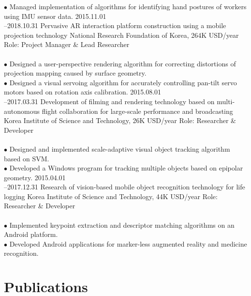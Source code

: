 \documentclass[]{friggeri-cv}
\begin{document}
\begin{entrylist}
{    $\bullet$ Managed implementation of algorithms for identifying hand postures of workers using IMU sensor data.
    }
  \entry
    {2015.11.01\\--2018.10.31} 
    {Pervasive AR interaction platform construction using a mobile projection technology}
    {National Research Foundation of Korea, 264K USD/year}
    {Role: Project Manager \& Lead Researcher\\
    \\
    $\bullet$ Designed a user-perspective rendering algorithm for correcting distortions of projection mapping caused by surface geometry.\\
    $\bullet$ Designed  a visual servoing algorithm for accurately controlling pan-tilt servo motors based on rotation axis calibration.
    }
  \entry
    {2015.08.01\\--2017.03.31}
    {Development of filming and rendering technology based on multi-autonomous flight collaboration for large-scale performance and broadcasting}
    {Korea Institute of Science and Technology, 26K USD/year}
    {Role: Researcher \& Developer\\
    \\
    $\bullet$ Designed and implemented scale-adaptive visual object tracking algorithm based on SVM.\\
    $\bullet$ Developed a Windows program for tracking multiple objects based on epipolar geometry.
    }
  \entry
    {2015.04.01\\--2017.12.31}
    {Research of vision-based mobile object recognition technology for life logging}
    {Korea Institute of Science and Technology, 44K USD/year}
    {Role: Researcher \& Developer\\
    \\
    $\bullet$ Implemented keypoint extraction and descriptor matching algorithms on an Android platform.\\
    $\bullet$ Developed Android applications for marker-less augmented reality and medicine recognition.
    }
\end{entrylist}

\section{Publications}

\begin{refsection}
  \nocite{*}
  \printbibliography[
    type=article, 
    title=\textbf{Articles in peer-reviewed journals}, 
    heading=subbibliography
  ]
\end{refsection}

\begin{refsection}
  \nocite{*}
  \printbibliography[
    type=inproceedings, 
    title=\textbf{Proceedings at peer-reviewed conferences}, 
    heading=subbibliography
  ]
\end{refsection}
\end{document}
